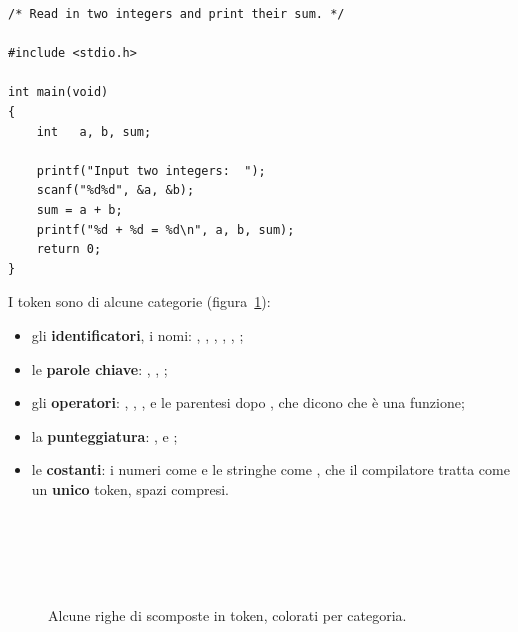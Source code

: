 \begin{affianco}[0.58]
\begin{lstlisting}[style=c, name=somma.c]
/* Read in two integers and print their sum. */

#include <stdio.h>

int main(void)
{
    int   a, b, sum;

    printf("Input two integers:  ");
    scanf("%d%d", &a, &b);
    sum = a + b;
    printf("%d + %d = %d\n", a, b, sum);
    return 0;
}
\end{lstlisting}
\risultato
{}
\end{affianco}

I token sono di alcune categorie (figura~\ref{fig:token}):

\begin{itemize}
  \item gli \textbf{identificatori}, i nomi: , ,
        , , , ;
  \item le \textbf{parole chiave}: , , ;
  \item gli \textbf{operatori}: \code{=}, \code{+}, \code{\&}, e le
        parentesi \code{( )} dopo , che dicono che  è
        una funzione;
  \item la \textbf{punteggiatura}: \code{\{ \}}, \code{;} e \code{,};
  \item le \textbf{costanti}: i numeri come  e le stringhe come
        , che il compilatore tratta come un
        \textbf{unico} token, spazi compresi.
\end{itemize}

\begin{figure}[H]
  \centering
  \begin{minipage}{15cm}
    \centering
    \ \ \ \ 
    \\[7pt]
    \ \ 
    \\[7pt]
    \ \ \ \ 
    \\[7pt]
    \ 
    \\[12pt]
    {\Lato\scriptsize
     \quad
     \quad
     \quad
     \quad
     }
  \end{minipage}
  \caption{Alcune righe di  scomposte in token, colorati per
           categoria.}
  \label{fig:token}
\end{figure}

